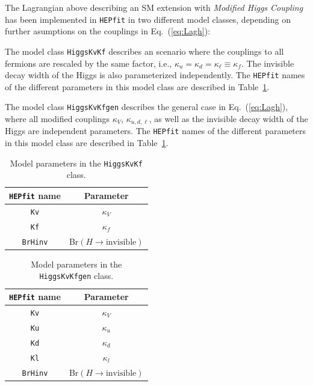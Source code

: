 \documentclass[preprint,3p,12pt]{elsarticle}
\newcommand{\HEPfit}{\texttt{HEPfit}\xspace}
\begin{document}
The Lagrangian above describing an SM extension with {\it Modified Higgs Coupling} has been implemented in {\tt HEPfit} in two different model classes, depending on further asumptions on the couplings in Eq.~(\ref{eq:Lagh}):
%
\begin{itemize}
{\item The model class {\tt HiggsKvKf} describes an scenario where the couplings to all fermions are rescaled by the same factor, i.e., $\kappa_u=\kappa_d=\kappa_\ell \equiv \kappa_f$. The invisible decay width of the Higgs is also parameterized independently. The {\tt HEPfit} names of the different parameters in this model class are described in Table~\ref{tab:HiggsKvKfpars}.}
%
{\item The model class {\tt HiggsKvKfgen} describes the general case in Eq.~(\ref{eq:Lagh}), where all modified couplings $\kappa_V$, $\kappa_{u, d, \ell}$, as well as the invisible decay width of the Higgs are independent parameters. The {\tt HEPfit} names of the different parameters in this model class are described in Table~\ref{tab:HiggsKvKfpars}.
}
%
\end{itemize}
%
\begin{table}[tb]
 \centering
 \caption{Model parameters in the {\tt HiggsKvKf} class. }\vspace{0.2cm}
  \begin{tabular}{| c c | }
\hline
%
\textbf{\HEPfit name}&
\textbf{Parameter}\\
%
\hline
 {\tt Kv}&
$\kappa_V$\\
%
 {\tt Kf}&
$\kappa_f$\\
%
 {\tt BrHinv}&
Br$(H\to \mathrm{invisible})$\\
\hline
  \end{tabular}
 \label{tab:HiggsKvKfpars}
\end{table} 

 \begin{table}[tb]
 \centering
 \caption{Model parameters in the {\tt HiggsKvKfgen} class.}\vspace{0.2cm}
  \begin{tabular}{| c c | }
\hline
%
\textbf{\HEPfit name}&
\textbf{Parameter}\\
%
\hline
 {\tt Kv}&
$\kappa_V$\\
%
 {\tt Ku}&
$\kappa_u$\\
%
 {\tt Kd}&
$\kappa_d$\\
%
 {\tt Kl}&
$\kappa_l$\\
%
 {\tt BrHinv}&
Br$(H\to \mathrm{invisible})$\\
\hline
  \end{tabular}
 \label{tab:HiggsKvKfgenpars}
\end{table} 
\end{document}
